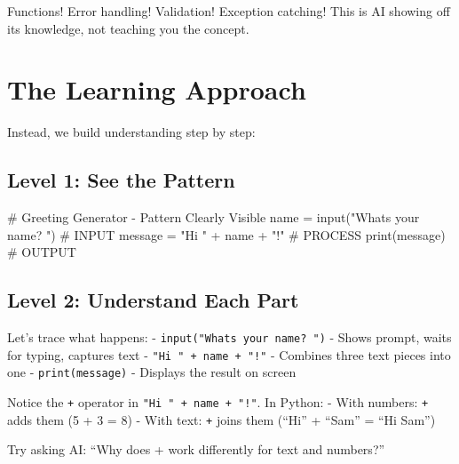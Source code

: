 \documentclass[
  letterpaper,
  DIV=11,
  numbers=noendperiod,
  oneside]{scrreprt}
\newenvironment{Shaded}{}{}
\newcommand{\BuiltInTok}[1]{\textcolor[rgb]{0.84,0.23,0.29}{#1}}
\newcommand{\CommentTok}[1]{\textcolor[rgb]{0.42,0.45,0.49}{#1}}
\newcommand{\NormalTok}[1]{\textcolor[rgb]{0.14,0.16,0.18}{#1}}
\newcommand{\OperatorTok}[1]{\textcolor[rgb]{0.14,0.16,0.18}{#1}}
\newcommand{\StringTok}[1]{\textcolor[rgb]{0.01,0.18,0.38}{#1}}
\begin{document}
Functions! Error handling! Validation! Exception catching! This is AI
showing off its knowledge, not teaching you the concept.

\section{The Learning Approach}\label{the-learning-approach}

Instead, we build understanding step by step:

\subsection{Level 1: See the Pattern}\label{level-1-see-the-pattern}

\begin{Shaded}
\begin{Highlighting}[]
\CommentTok{\# Greeting Generator {-} Pattern Clearly Visible}
\NormalTok{name }\OperatorTok{=} \BuiltInTok{input}\NormalTok{(}\StringTok{"What\textquotesingle{}s your name? "}\NormalTok{)      }\CommentTok{\# INPUT}
\NormalTok{message }\OperatorTok{=} \StringTok{"Hi "} \OperatorTok{+}\NormalTok{ name }\OperatorTok{+} \StringTok{"!"}            \CommentTok{\# PROCESS}
\BuiltInTok{print}\NormalTok{(message)                          }\CommentTok{\# OUTPUT}
\end{Highlighting}
\end{Shaded}

\subsection{Level 2: Understand Each
Part}\label{level-2-understand-each-part}

Let's trace what happens: -
\texttt{input("What\textquotesingle{}s\ your\ name?\ ")} - Shows prompt,
waits for typing, captures text - \texttt{"Hi\ "\ +\ name\ +\ "!"} -
Combines three text pieces into one - \texttt{print(message)} - Displays
the result on screen

\begin{tcolorbox}[enhanced jigsaw, opacityback=0, colback=white, colframe=quarto-callout-note-color-frame, breakable, titlerule=0mm, coltitle=black, rightrule=.15mm, colbacktitle=quarto-callout-note-color!10!white, left=2mm, bottomtitle=1mm, bottomrule=.15mm, title=\textcolor{quarto-callout-note-color}{\faInfo}\hspace{0.5em}{Expression Explorer: Text Joining}, opacitybacktitle=0.6, toptitle=1mm, leftrule=.75mm, arc=.35mm, toprule=.15mm]

Notice the \texttt{+} operator in \texttt{"Hi\ "\ +\ name\ +\ "!"}. In
Python: - With numbers: \texttt{+} adds them (5 + 3 = 8) - With text:
\texttt{+} joins them (``Hi'' + ``Sam'' = ``Hi Sam'')

Try asking AI: ``Why does + work differently for text and numbers?''

\end{tcolorbox}
\end{document}
